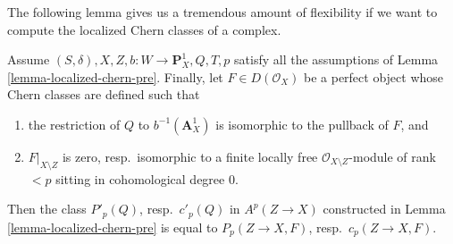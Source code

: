 \noindent
The following lemma gives us a tremendous amount of flexibility
if we want to compute the localized Chern classes of a complex.

\begin{lemma}
\label{lemma-independent-loc-chern-bQ}
Assume $(S, \delta), X, Z, b : W \to \mathbf{P}^1_X, Q, T, p$
satisfy all the assumptions of Lemma \ref{lemma-localized-chern-pre}.
Finally, let $F \in D(\mathcal{O}_X)$ be a perfect object whose
Chern classes are defined such that
\begin{enumerate}
\item the restriction of $Q$ to $b^{-1}(\mathbf{A}^1_X)$ is
isomorphic to the pullback of $F$, and
\item $F|_{X \setminus Z}$ is zero, resp.\ isomorphic to a finite
locally free $\mathcal{O}_{X \setminus Z}$-module of rank $< p$
sitting in cohomological degree $0$.
\end{enumerate}
Then the class $P'_p(Q)$, resp.\ $c'_p(Q)$ in $A^p(Z \to X)$ constructed
in Lemma \ref{lemma-localized-chern-pre}
is equal to $P_p(Z \to X, F)$, resp.\ $c_p(Z \to X, F)$.
\end{lemma}


